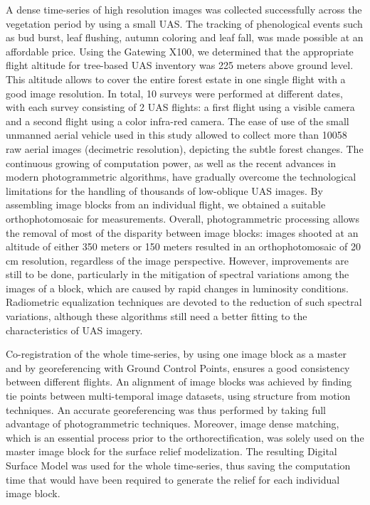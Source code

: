 \documentclass[remotesensing,article,submit,moreauthors,pdftex,12pt,a4paper]{mdpi} %
\begin{document}
A dense time-series of high resolution images was collected successfully across the vegetation period by using a small UAS. 
The tracking of phenological events such as bud burst, leaf flushing, autumn coloring and leaf fall, was made possible at an affordable price. 
Using the Gatewing X100, we determined that the appropriate flight altitude for tree-based UAS inventory was 225 meters above ground level. 
This altitude allows to cover the entire forest estate in one single flight with a good image resolution. 
In total, 10 surveys were performed at different dates, with each survey consisting of 2 UAS flights: a first flight using a visible camera and a second flight using a color infra-red camera. 
The ease of use of the small unmanned aerial vehicle used in this study allowed to collect more than 10058 raw aerial images (decimetric resolution), depicting the subtle forest changes. 
The continuous growing of computation power, as well as the recent advances in modern photogrammetric algorithms, have gradually overcome the technological limitations for the handling of thousands of low-oblique UAS images. 
By assembling image blocks from an individual flight, we obtained a suitable orthophotomosaic for measurements. 
Overall, photogrammetric processing allows the removal of most of the disparity between image blocks: images shooted at an altitude of either 350 meters or 150 meters resulted in an orthophotomosaic of 20 cm resolution, regardless of the image perspective.
However, improvements are still to be done, particularly in the mitigation of spectral variations among the images of a block, which are caused by rapid changes in luminosity conditions.
Radiometric equalization techniques are devoted to the reduction of such spectral variations, although these algorithms still need a better fitting to the characteristics of UAS imagery.

Co-registration of the whole time-series, by using one image block as a master and by georeferencing with Ground Control Points, ensures a good consistency between different flights. 
An alignment of image blocks was achieved by finding tie points between multi-temporal image datasets, using structure from motion techniques. 
An accurate georeferencing was thus performed by taking full advantage of photogrammetric techniques.
Moreover, image dense matching, which is an essential process prior to the orthorectification, was solely used on the master image block for the surface relief modelization.
The resulting Digital Surface Model was used for the whole time-series, thus saving the computation time that would have been required to generate the relief for each individual image block.
\end{document}
